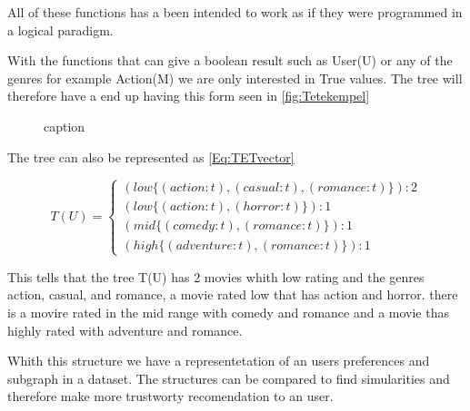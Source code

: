 All of these functions has a been intended to work as if they were programmed in a logical paradigm. 

With the functions that can give a boolean result such as User(U) or any of the genres for example Action(M) we are only interested in True values. The tree will therefore have a end up having this form seen in \autoref{fig:Tetekempel}

\begin{figure}[H]
    \centering
    \begin{adjustbox}{width=0.5\textwidth}
    
    \end{adjustbox}
    \caption{caption}
    \label{fig:Tetekempel}	
\end{figure}


The tree can also be represented as \autoref{Eq:TETvector}

\begin{equation}\label{Eq:TETvector}
    T(U)=
    \begin{cases}
      (low \{(action:t),(casual:t), (romance:t)\}):2 \\
      (low \{(action:t),(horror:t)\}):1 \\
      (mid \{(comedy:t),(romance:t)\}):1 \\
      (high\{(adventure:t),(romance:t)\}):1
    \end{cases}
\end{equation}

This tells that the tree T(U) has 2 movies whith low rating and the genres action, casual, and romance, a movie rated low that has action and horror. there is a movire rated in the mid range with comedy and romance and a movie thas highly rated with adventure and romance.

Whith this structure we have a representetation of an users preferences and subgraph in a dataset. 
The structures can be compared to find simularities and therefore make more trustworty recomendation to an user.
